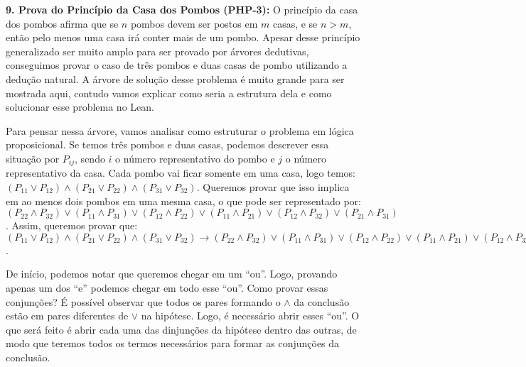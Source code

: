 \bigbreak
\textbf{9. Prova do Princípio da Casa dos Pombos (PHP-3):}
    O princípio da casa dos pombos afirma que se $n$ pombos devem ser postos em $m$ casas, e se $n > m$, então pelo menos uma casa irá conter mais de um pombo. Apesar desse princípio  generalizado ser muito amplo para ser provado por árvores dedutivas, conseguimos provar o caso de três pombos e duas casas de pombo utilizando a dedução natural. A árvore de solução desse problema é muito grande para ser mostrada aqui, contudo vamos explicar como seria a estrutura dela e como solucionar esse problema no Lean. 
    
    Para pensar nessa árvore, vamos analisar como estruturar o problema em lógica proposicional. Se temos três pombos e duas casas, podemos descrever essa situação por $P_{ij}$, sendo $i$ o número representativo do pombo e $j$ o número representativo da casa. Cada pombo vai ficar somente em uma casa, logo temos: $(P_{11} \lor P_{12}) \land (P_{21} \lor P_{22}) \land (P_{31} \lor P_{32})$. Queremos provar que isso implica em ao menos dois pombos em uma mesma casa, o que pode ser representado por: $(P_{22} \land P_{32}) \lor (P_{11} \land P_{31}) \lor (P_{12} \land P_{22}) \lor (P_{11} \land P_{21}) \lor (P_{12} \land P_{32}) \lor (P_{21} \land P_{31})$. Assim, queremos provar que: $(P_{11} \lor P_{12}) \land (P_{21} \lor P_{22}) \land (P_{31} \lor P_{32}) \rightarrow (P_{22} \land P_{32}) \lor (P_{11} \land P_{31}) \lor (P_{12} \land P_{22}) \lor (P_{11} \land P_{21}) \lor (P_{12} \land P_{32}) \lor (P_{21} \land P_{31})$.
    
    De início, podemos notar que queremos chegar em um ``ou''. Logo, provando apenas um dos ``e'' podemos chegar em todo esse ``ou''. Como provar essas conjunções? É possível observar que todos os pares formando o $\land$ da conclusão estão em pares diferentes de $\lor$ na hipótese. Logo, é necessário abrir esses ``ou''. O que será feito é abrir cada uma das dinjunções da hipótese dentro das outras, de modo que teremos todos os termos necessários para formar as conjunções da conclusão. 
    

